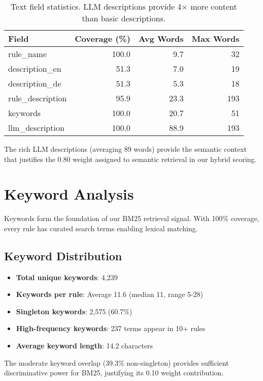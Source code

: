 \begin{table}[H]
\centering
\begin{tabular}{lrrr}
\toprule
\textbf{Field} & \textbf{Coverage (\%)} & \textbf{Avg Words} & \textbf{Max Words} \\
\midrule
rule\_name & 100.0 & 9.7 & 32 \\
description\_en & 51.3 & 7.0 & 19 \\
description\_de & 51.3 & 5.3 & 18 \\
rule\_description & 95.9 & 23.3 & 193 \\
keywords & 100.0 & 20.7 & 51 \\
llm\_description & 100.0 & 88.9 & 193 \\
\bottomrule
\end{tabular}
\caption{Text field statistics. LLM descriptions provide 4× more content than basic descriptions.}
\label{tab:text-stats}
\end{table}

The rich LLM descriptions (averaging 89 words) provide the semantic context that justifies the 0.80 weight assigned to semantic retrieval in our hybrid scoring.

\section{Keyword Analysis}

Keywords form the foundation of our BM25 retrieval signal. With 100\% coverage, every rule has curated search terms enabling lexical matching.

\subsection{Keyword Distribution}

\begin{itemize}[leftmargin=*,itemsep=2pt,topsep=2pt]
 \item \textbf{Total unique keywords}: 4,239
 \item \textbf{Keywords per rule}: Average 11.6 (median 11, range 5-28)
 \item \textbf{Singleton keywords}: 2,575 (60.7\%)
 \item \textbf{High-frequency keywords}: 237 terms appear in 10+ rules
 \item \textbf{Average keyword length}: 14.2 characters
\end{itemize}

The moderate keyword overlap (39.3\% non-singleton) provides sufficient discriminative power for BM25, justifying its 0.10 weight contribution.

